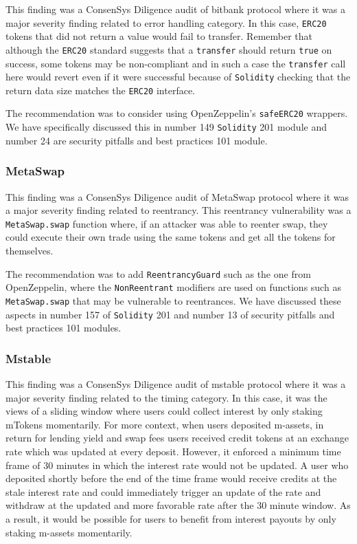 This finding was a ConsenSys Diligence audit of bitbank protocol where
it was a major severity finding related to error handling category. In
this case, \texttt{ERC20} tokens that did not return a value would fail
to transfer. Remember that although the \texttt{ERC20} standard suggests
that a \texttt{transfer} should return \texttt{true} on success, some
tokens may be non-compliant and in such a case the \texttt{transfer}
call here would revert even if it were successful because of
\texttt{Solidity} checking that the return data size matches the
\texttt{ERC20} interface.

The recommendation was to consider using OpenZeppelin's
\texttt{safeERC20} wrappers. We have specifically discussed this in
number 149 \texttt{Solidity} 201 module and number 24 are security
pitfalls and best practices 101 module.

\subsubsection{MetaSwap}\label{metaswap}

This finding was a ConsenSys Diligence audit of MetaSwap protocol where
it was a major severity finding related to reentrancy. This reentrancy
vulnerability was a \texttt{MetaSwap.swap} function where, if an
attacker was able to reenter swap, they could execute their own trade
using the same tokens and get all the tokens for themselves.

The recommendation was to add \texttt{ReentrancyGuard} such as the one
from OpenZeppelin, where the \texttt{NonReentrant} modifiers are used on
functions such as \texttt{MetaSwap.swap} that may be vulnerable to
reentrances. We have discussed these aspects in number 157 of
\texttt{Solidity} 201 and number 13 of security pitfalls and best
practices 101 modules.

\subsubsection{Mstable}\label{mstable}

This finding was a ConsenSys Diligence audit of mstable protocol where
it was a major severity finding related to the timing category. In this
case, it was the views of a sliding window where users could collect
interest by only staking mTokens momentarily. For more context, when
users deposited m-assets, in return for lending yield and swap fees
users received credit tokens at an exchange rate which was updated at
every deposit. However, it enforced a minimum time frame of 30 minutes
in which the interest rate would not be updated. A user who deposited
shortly before the end of the time frame would receive credits at the
stale interest rate and could immediately trigger an update of the rate
and withdraw at the updated and more favorable rate after the 30 minute
window. As a result, it would be possible for users to benefit from
interest payouts by only staking m-assets momentarily.

